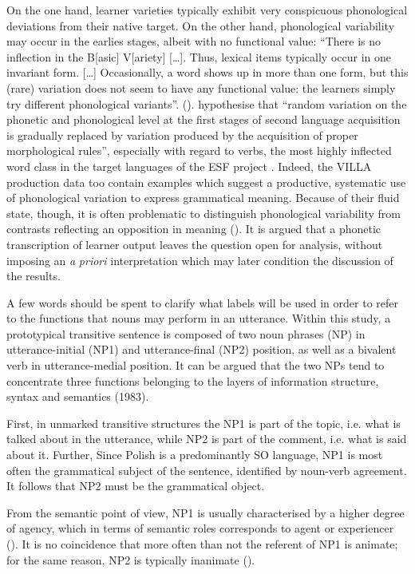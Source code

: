 On the one hand, learner varieties typically exhibit very conspicuous phonological deviations from their native target. On the other hand, phonological variability may occur in the earlies stages, albeit with no functional value: “There is no inflection in the B[asic] V[ariety] […]. Thus, lexical items typically occur in one invariant form. […] Occasionally, a word shows up in more than one form, but this (rare) variation does not seem to have any functional value: the learners simply try different phonological variants”. (\citealt[311]{KleinPerdue1997}). \citet[160–161]{BroederEtAl1993} hypothesise that “random variation on the phonetic and phonological level at the first stages of second language acquisition is gradually replaced by variation produced by the acquisition of proper morphological rules”, especially with regard to verbs, the most highly inflected word class in the target languages of the ESF project \citep{Perdue1993}. Indeed, the VILLA production data too contain examples which suggest a productive, systematic use of phonological variation to express grammatical meaning. Because of their fluid state, though, it is often problematic to distinguish phonological variability from contrasts reflecting an opposition in meaning (\citealt{Bernini2018Fonetica, Bernini2018Pattern, Dimroth2018}). It is argued that a phonetic transcription of learner output leaves the question open for analysis, without imposing an \textit{a} \textit{priori} interpretation which may later condition the discussion of the results.

A few words should be spent to clarify what labels will be used in order to refer to the functions that nouns may perform in an utterance. Within this study, a prototypical transitive sentence is composed of two noun phrases (NP) in utterance-initial (NP1) and utterance-final (NP2) position, as well as a bivalent verb in utterance-medial position. It can be argued that the two NPs tend to concentrate three functions belonging to the layers of information structure, syntax and semantics (1983).

First, in unmarked transitive structures the NP1 is part of the topic, i.e. what is talked about in the utterance, while NP2 is part of the comment, i.e. what is said about it. Further, Since Polish is a predominantly SO language, NP1 is most often the grammatical subject of the sentence, identified by noun-verb agreement. It follows that NP2 must be the grammatical object.

From the semantic point of view, NP1 is usually characterised by a higher degree of agency, which in terms of semantic roles corresponds to agent or experiencer (). It is no coincidence that more often than not the referent of NP1 is animate; for the same reason, NP2 is typically inanimate ().

